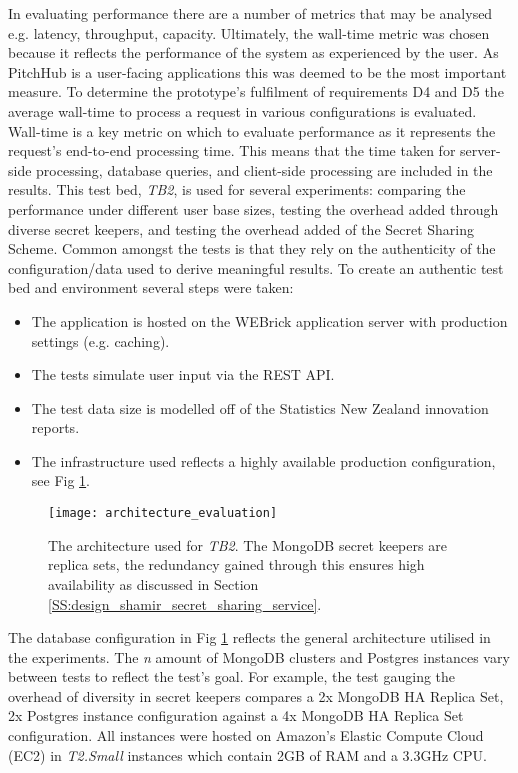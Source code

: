 In evaluating performance there are a number of metrics that may be analysed e.g. latency, throughput, capacity. Ultimately, the wall-time metric was chosen because it reflects the performance of the system as experienced by the user. As PitchHub is a user-facing applications this was deemed to be the most important measure. To determine the prototype's fulfilment of requirements D4 and D5 the average wall-time to process a request in various configurations is evaluated. Wall-time is a key metric on which to evaluate performance as it represents the request's end-to-end processing time. This means that the time taken for server-side processing, database queries, and client-side processing are included in the results. This test bed, \textit{TB2}, is used for several experiments: comparing the performance under different user base sizes, testing the overhead added through diverse secret keepers, and testing the overhead added of the Secret Sharing Scheme. Common amongst the tests is that they rely on the authenticity of the configuration/data used to derive meaningful results. To create an authentic test bed and environment several steps were taken:
\begin{itemize}  
    \item The application is hosted on the WEBrick application server with production settings (e.g. caching).
    \item The tests simulate user input via the REST API.
    \item The test data size is modelled off of the Statistics New Zealand innovation reports.
    \item The infrastructure used reflects a highly available production configuration, see Fig \ref{fig:architecture_evaluation}.
\end{itemize}

\begin{figure}[ht]
    \centering
    \texttt{[image: architecture\_evaluation]}
    \caption{The architecture used for \textit{TB2}. The MongoDB secret keepers are replica sets, the redundancy gained through this ensures high availability as discussed in Section \ref{SS:design_shamir_secret_sharing_service}.}
    \label{fig:architecture_evaluation}
\end{figure}

The database configuration in Fig \ref{fig:architecture_evaluation} reflects the general architecture utilised in the experiments. The \textit{n} amount of MongoDB clusters and Postgres instances vary between tests to reflect the test's goal. For example, the test gauging the overhead of diversity in secret keepers compares a 2x MongoDB HA Replica Set, 2x Postgres instance configuration against a 4x MongoDB HA Replica Set configuration. All instances were hosted on Amazon's Elastic Compute Cloud (EC2) in \textit{T2.Small} instances which contain 2GB of RAM and a 3.3GHz CPU.

